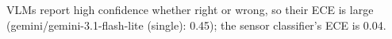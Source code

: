 VLMs report high confidence whether right or wrong, so their ECE is large (gemini/gemini-3.1-flash-lite (single): 0.45); the sensor classifier's ECE is 0.04.
